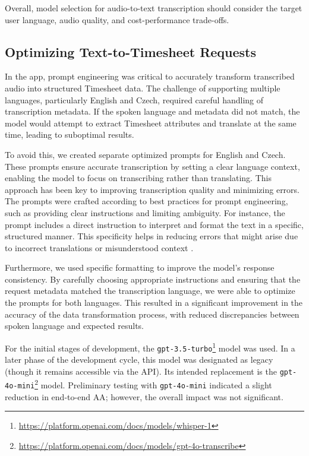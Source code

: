 \documentclass[
  digital,     %
  oneside,     %
  nosansbold,  %
  nocolorbold, %
  lof,         %
  lot,         %
]{fithesis4}
\begin{document}
Overall, model selection for audio-to-text transcription should consider the target user language, audio quality, and cost-performance trade-offs.

\subsection{Optimizing Text-to-Timesheet Requests}

In the app, prompt engineering was critical to accurately transform transcribed audio into structured Timesheet data. The challenge of supporting multiple languages, particularly English and Czech, required careful handling of transcription metadata. If the spoken language and metadata did not match, the model would attempt to extract Timesheet attributes and translate at the same time, leading to suboptimal results.

To avoid this, we created separate optimized prompts for English and Czech. These prompts ensure accurate transcription by setting a clear language context, enabling the model to focus on transcribing rather than translating. This approach has been key to improving transcription quality and minimizing errors. The prompts were crafted according to best practices for prompt engineering, such as providing clear instructions and limiting ambiguity. For instance, the prompt includes a direct instruction to interpret and format the text in a specific, structured manner. This specificity helps in reducing errors that might arise due to incorrect translations or misunderstood context \cite{openaiPrompt}.

Furthermore, we used specific formatting to improve the model’s response consistency. By carefully choosing appropriate instructions and ensuring that the request metadata matched the transcription language, we were able to optimize the prompts for both languages. This resulted in a significant improvement in the accuracy of the data transformation process, with reduced discrepancies between spoken language and expected results.

For the initial stages of development, the \texttt{gpt-3.5-turbo}\footnote{\url{https://platform.openai.com/docs/models/whisper-1}} model was used. In a later phase of the development cycle, this model was designated as legacy (though it remains accessible via the \gls{API}). Its intended replacement is the \texttt{gpt-4o-mini}\footnote{\url{https://platform.openai.com/docs/models/gpt-4o-transcribe}} model. Preliminary testing with \texttt{gpt-4o-mini} indicated a slight reduction in end-to-end \gls{AA}; however, the overall impact was not significant.
\end{document}
